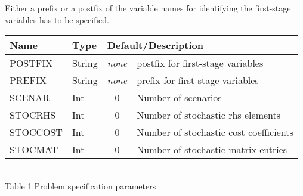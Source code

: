 \documentclass[11pt,draft]{article}
\newcommand{\+}{{\ti{+}}}
\newcommand{\1}{{\ti{1}}}
\begin{document}
Either a prefix or a postfix of the variable names for identifying the first-stage variables has to be specified.



\begin{center}
\begin{tabular}{|llcp{6.9cm}|} 
\hline
Name&Type&\multicolumn{2}{l|}{Default/Description}\\ \hline
POSTFIX   & String &  {\it none} & postfix for first-stage variables\\
PREFIX    & String &  {\it none} & prefix for first-stage variables\\[0.2em]
SCENAR    & Int &  0 & Number of scenarios                   \\[0.2em]
STOCRHS   & Int &  0 & Number of stochastic rhs elements     \\
STOCCOST  & Int &  0 & Number of stochastic cost coefficients\\
STOCMAT   & Int &  0 & Number of stochastic matrix entries   \\
\hline
\end{tabular}
\\[0.5em]{Table 1:\quad Problem specification parameters}
\end{center}

%
\end{document}

